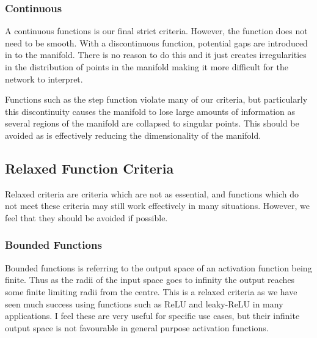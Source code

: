 \documentclass[onecolumn]{article}
\begin{document}

    \subsubsection{Continuous}
    
    A continuous functions is our final strict criteria. However, the function does not need to be smooth. With a discontinuous function, potential gaps are introduced in to the manifold. There is no reason to do this and it just creates irregularities in the distribution of points in the manifold making it more difficult for the network to interpret.
    
    Functions such as the step function violate many of our criteria, but particularly this discontinuity causes the manifold to lose large amounts of information as several regions of the manifold are collapsed to singular points. This should be avoided as is effectively reducing the dimensionality of the manifold.


    \subsection{Relaxed Function Criteria}
        
    Relaxed criteria are criteria which are not as essential, and functions which do not meet these criteria may still work effectively in many situations. However, we feel that they should be avoided if possible.
        
    \subsubsection{Bounded Functions}
        
    Bounded functions is referring to the output space of an activation function being finite. Thus as the radii of the input space goes to infinity the output reaches some finite limiting radii from the centre. This is a relaxed criteria as we have seen much success using functions such as ReLU and leaky-ReLU in many applications. I feel these are very useful for specific use cases, but their infinite output space is not favourable in general purpose activation functions.
    
\end{document}

